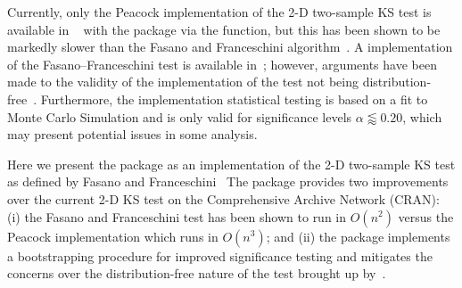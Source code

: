 \documentclass[codesnippet]{jss}
\newcommand{\fct}[1]{\code{#1()}}
\begin{document}
Currently, only the Peacock implementation of the 2-D two-sample KS test is available in ~\citep{R} with the  package via the \fct{peacock2} function, but this has been shown to be markedly slower than the Fasano and Franceschini algorithm~\citep{Lopes2007}. A  implementation of the Fasano--Franceschini test is available in~\citep{numericalRecipes}; however, arguments have been made to the validity of the implementation of the test not being distribution-free~\citep{Babu2006}. Furthermore, the  implementation statistical testing is based on a fit to Monte Carlo Simulation and is only valid for significance levels $\alpha \lessapprox 0.20$, which may present potential issues in some analysis.

Here we present the  package as an  implementation of the 2-D two-sample KS test as defined by Fasano and Franceschini~\citep{Fasano1987} The  package provides two improvements over the current 2-D KS test on the Comprehensive  Archive Network (CRAN): (i) the Fasano and Franceschini test has been shown to run in $O(n^2)$ versus the Peacock implementation which runs in $O(n^3)$; and (ii) the package implements a bootstrapping procedure for improved significance testing and mitigates the concerns over the distribution-free nature of the test brought up by~\citep{Babu2006}.
\end{document}
